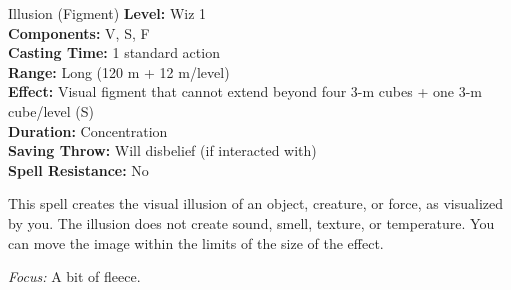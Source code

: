 {Illusion (Figment)}
{
	\textbf{Level:}
	Wiz 1\\
	\textbf{Components:}
	V, S, F\\
	\textbf{Casting Time:}
	1 standard action\\
	\textbf{Range:}
	Long (120 m + 12 m/level)\\
	\textbf{Effect:}
	Visual figment that cannot extend beyond four 3-m cubes + one 3-m cube/level (S)\\
	\textbf{Duration:}
	Concentration\\
	\textbf{Saving Throw:}
	Will disbelief (if interacted with)\\
	\textbf{Spell Resistance:}
	No\\
}
{
	This spell creates the visual illusion of an object, creature, or force, as visualized by you. The illusion does not create sound, smell, texture, or temperature. You can move the image within the limits of the size of the effect.

	\textit{Focus:}
	A bit of fleece.

}
